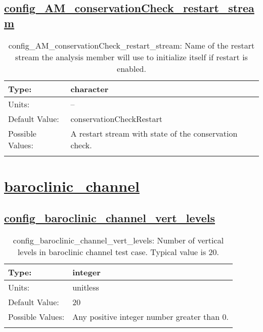 \subsection[config\_AM\_conservationCheck\_restart\_stream]{\hyperref[sec:nm_tab_AM_conservationCheck]{config\_AM\_conservationCheck\_restart\_stream}}
\label{subsec:nm_sec_config_AM_conservationCheck_restart_stream}
\begin{center}
\begin{longtable}{| p{2.0in} || p{4.0in} |}
    \hline
    Type: & character \\
    \hline
    Units: & -- \\
    \hline
    Default Value: & conservationCheckRestart \\
    \hline
    Possible Values: & A restart stream with state of the conservation check. \\
    \hline
    \caption{config\_AM\_conservationCheck\_restart\_stream: Name of the restart stream the analysis member will use to initialize itself if restart is enabled.}
\end{longtable}
\end{center}
\section[baroclinic\_channel]{\hyperref[sec:nm_tab_baroclinic_channel]{baroclinic\_channel}}
\label{sec:nm_sec_baroclinic_channel}
\subsection[config\_baroclinic\_channel\_vert\_levels]{\hyperref[sec:nm_tab_baroclinic_channel]{config\_baroclinic\_channel\_vert\_levels}}
\label{subsec:nm_sec_config_baroclinic_channel_vert_levels}
\begin{center}
\begin{longtable}{| p{2.0in} || p{4.0in} |}
    \hline
    Type: & integer \\
    \hline
    Units: & \si{unitless} \\
    \hline
    Default Value: & 20 \\
    \hline
    Possible Values: & Any positive integer number greater than 0. \\
    \hline
    \caption{config\_baroclinic\_channel\_vert\_levels: Number of vertical levels in baroclinic channel test case. Typical value is 20.}
\end{longtable}
\end{center}

